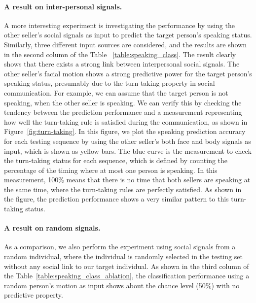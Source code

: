\paragraph{A result on inter-personal signals.}
A more interesting experiment is investigating the performance by using the other seller's social signals as input to predict the target person's speaking status. Similarly, three different input sources are considered, and the results are shown in the second column of the Table ~\ref{table:speaking_class}.  The result clearly shows that there exists a strong link between interpersonal social signals. The other seller's facial motion shows a strong predictive power for the target person's speaking status, presumably due to the turn-taking property in social communication. For example, we can assume that the target person is not speaking, when the other seller is speaking. We can verify this by checking the tendency between the prediction performance and a measurement representing how well the turn-taking rule is satisfied during the communication, as shown in Figure~\ref{fig:turn-taking}. In this figure, we plot the speaking prediction accuracy for each testing sequence by using the other seller's both face and body signals as input, which is shown as yellow bars. The blue curve is the measurement to check the turn-taking status for each sequence, which is defined by counting the percentage of the timing where at most one person is speaking. In this measurement, 100\% means that there is no time that both sellers are speaking at the same time, where the turn-taking rules are perfectly satisfied. As shown in the figure, the prediction performance shows a very similar pattern to this turn-taking status. 

\paragraph{A result on random signals.}
As a comparison, we also perform the experiment using social signals from a random individual, where the individual is randomly selected in the testing set without any social link to our target individual. As shown in the third column of the Table~\ref{table:speaking_class_ablation}, the classification performance using a random person's motion as input shows about the chance level (50\%) with no predictive property.



